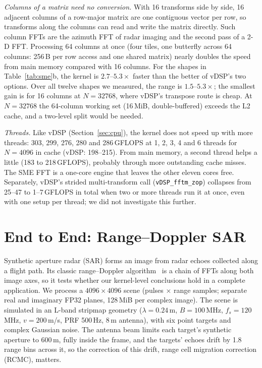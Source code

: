 \documentclass[conference]{IEEEtran}
\newcommand{\GF}{\,GFLOPS}
\begin{document}
\textit{Columns of a matrix need no conversion.} With 16 transforms side by side, 16 adjacent columns of a
row-major matrix are one contiguous vector per row, so transforms along the columns can read and write
the matrix directly. Such column FFTs are the azimuth FFT of radar imaging and the second pass of a 2-D
FFT. Processing 64 columns at once (four tiles, one butterfly across 64 columns: 256\,B per row access
and one shared matrix) nearly doubles the speed from main memory compared with 16 columns. For the
shapes in Table~\ref{tab:sme}b, the kernel is $2.7$--$5.3\times$ faster than the better of vDSP's two
options. Over all twelve shapes we measured, the range is $1.5$--$5.3\times$; the smallest gain is for 16
columns at $N=32768$, where vDSP's transpose route is cheap. At $N=32768$ the 64-column working set
(16\,MiB, double-buffered) exceeds the L2 cache, and a two-level split would be needed.

\textit{Threads.} Like vDSP (Section~\ref{sec:cpu}), the kernel does not speed up with more threads:
303, 299, 276, 280 and 286\GF{} at 1, 2, 3, 4 and 6 threads for $N=4096$ in cache (vDSP: 198--215).
From main memory, a second thread helps a little (183 to 218\GF{}), probably through more outstanding
cache misses. The SME FFT is a one-core engine that leaves the other eleven cores free. Separately,
vDSP's strided multi-transform call (\texttt{vDSP\_fftm\_zop}) collapses from 25--47 to 1--7\GF{} in total
when two or more threads run it at once, even with one setup per thread; we did not investigate this
further.

\section{End to End: Range--Doppler SAR}\label{sec:sar}

Synthetic aperture radar (SAR) forms an image from radar echoes collected along a flight path. Its
classic range--Doppler algorithm~\cite{cumming2005sar} is a chain of FFTs along both image axes, so it
tests whether our kernel-level conclusions hold in a complete application. We process a
$4096\times4096$ scene (pulses $\times$ range samples; separate real and imaginary FP32 planes,
128\,MiB per complex image). The scene is simulated in an L-band stripmap geometry
($\lambda=0.24$\,m, $B=100$\,MHz, $f_s=120$\,MHz, $v=200$\,m/s, PRF 500\,Hz, 8\,m antenna), with six
point targets and complex Gaussian noise. The antenna beam limits each target's synthetic aperture to
600\,m, fully inside the frame, and the targets' echoes drift by 1.8 range bins across it, so the
correction of this drift, range cell migration correction (RCMC), matters.
\end{document}
